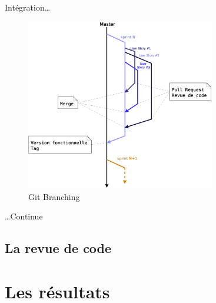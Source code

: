 \documentclass{beamer}
\begin{document}
\begin{frame}{Intégration\ldots}
	\begin{figure}[H]
		\includegraphics[height=7.5cm]{images/BranchingWorkflow.eps}
		\vspace{-10px}
		\caption{Git Branching}
	\end{figure}
\end{frame}

\begin{frame}{\ldots Continue}
\end{frame}
\subsection{La revue de code}
\begin{frame}
	
\end{frame}
\section{Les résultats} %
\end{document}
